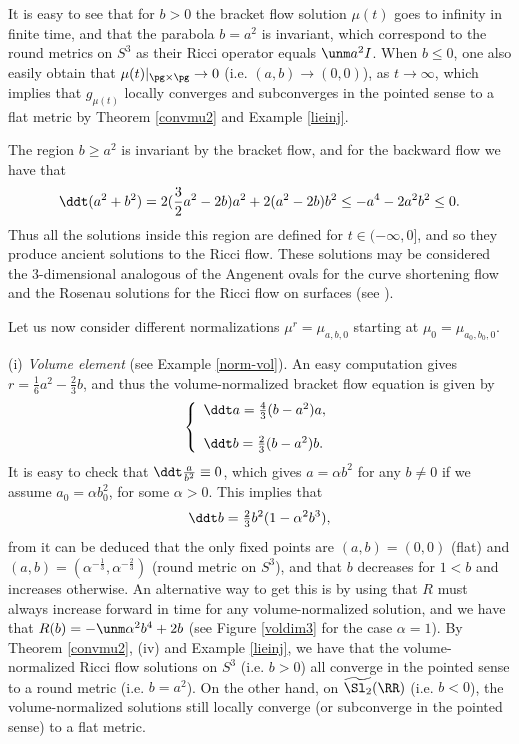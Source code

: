 \documentclass[11pt]{amsart}
\theoremstyle{plain}
\theoremstyle{definition}
\theoremstyle{remark}
\begin{document}
It is easy to see that for $b>0$ the bracket flow solution $\mu(t)$ goes to infinity in finite time, and that the parabola $b=a^2$ is invariant, which correspond to the round metrics on $S^3$ as their Ricci operator equals $\unm a^2I$.  When $b\leq 0$, one also easily obtain that $\mu(t)|_{\pg\times\pg}\to 0$ (i.e. $(a,b)\to(0,0)$), as $t\to\infty$, which implies that $g_{\mu(t)}$ locally converges and subconverges in the pointed sense to a flat metric by Theorem \ref{convmu2} and Example \ref{lieinj}.

The region $b\geq a^2$ is invariant by the bracket flow, and for the backward flow we have that
$$
\ddt (a^2+b^2)=2(\frac{3}{2}a^2-2b)a^2+2(a^2-2b)b^2\leq -a^4-2a^2b^2\leq 0.
$$
Thus all the solutions inside this region are defined for $t\in (-\infty,0]$, and so they produce ancient solutions to the Ricci flow.  These solutions may be considered the $3$-dimensional analogous of the Angenent ovals for the curve shortening flow and the Rosenau solutions for the Ricci flow on surfaces (see \cite[Chapter 2,Section 3.3]{ChwKnp}).

Let us now consider different normalizations $\mu^r=\mu_{a,b,0}$ starting at $\mu_0=\mu_{a_0,b_0,0}$.

\no
(i) {\it Volume element} (see Example \ref{norm-vol}).  An easy computation gives $r=\tfrac{1}{6}a^2-\tfrac{2}{3}b$, and thus the volume-normalized bracket flow equation is given by
$$
\left\{\begin{array}{l}
\ddt a=\tfrac{4}{3}(b-a^2)a, \\ \\
\ddt b=\tfrac{2}{3}(b-a^2)b.
\end{array}\right.
$$
It is easy to check that $\ddt \frac{a}{b^2}\equiv 0$, which gives $a=\alpha b^2$ for any $b\ne 0$ if we assume $a_0=\alpha b_0^2$, for some $\alpha>0$.  This implies that
$$
\ddt b = \tfrac{2}{3}b^2(1-\alpha^2b^3),
$$
from it can be deduced that the only fixed points are $(a,b)=(0,0)$ (flat) and $(a,b)=(\alpha^{-\frac{1}{3}},\alpha^{-\frac{2}{3}})$ (round metric on $S^3$), and that $b$ decreases for $1<b$ and increases otherwise.  An alternative way to get this is by using that $R$ must always increase forward in time for any volume-normalized solution, and we have that $R(b)=-\unm\alpha^2b^4+2b$ (see Figure \ref{voldim3} for the case $\alpha=1$).  By Theorem \ref{convmu2}, (iv) and Example \ref{lieinj}, we have that the volume-normalized Ricci flow solutions on $S^3$ (i.e. $b>0$) all converge in the pointed sense to a round metric (i.e. $b=a^2$).  On the other hand, on $\widetilde{\Sl_2}(\RR)$ (i.e. $b<0$), the volume-normalized solutions still locally converge (or subconverge in the pointed sense) to a flat metric.
\end{document}
